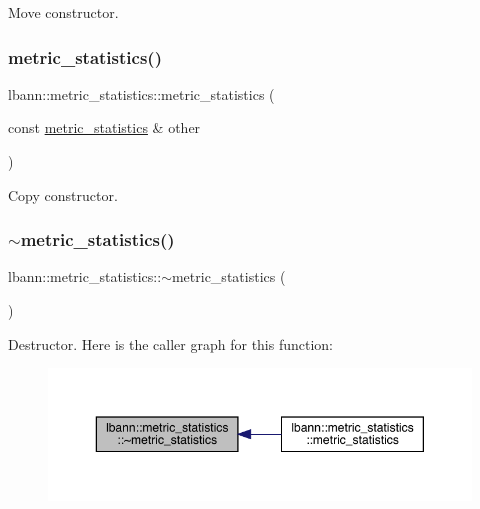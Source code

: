 Move constructor. \mbox{\label{structlbann_1_1metric__statistics_a4575aafb156f2d76a5bb29d7db1765c4}} 
\subsubsection{\texorpdfstring{metric\+\_\+statistics()}{metric\_statistics()}\hspace{0.1cm}{\footnotesize\ttfamily [3/3]}}
{\footnotesize\ttfamily lbann\+::metric\+\_\+statistics\+::metric\+\_\+statistics (\begin{DoxyParamCaption}\item[{const \hyperlink{structlbann_1_1metric__statistics}{metric\+\_\+statistics} \&}]{other }\end{DoxyParamCaption})\hspace{0.3cm}{\ttfamily [default]}}

Copy constructor. \mbox{\label{structlbann_1_1metric__statistics_aa25840fdf7ef1ea78523047cb904d2c3}} 
\subsubsection{\texorpdfstring{$\sim$metric\+\_\+statistics()}{~metric\_statistics()}}
{\footnotesize\ttfamily lbann\+::metric\+\_\+statistics\+::$\sim$metric\+\_\+statistics (\begin{DoxyParamCaption}{ }\end{DoxyParamCaption})\hspace{0.3cm}{\ttfamily [default]}}

Destructor. Here is the caller graph for this function\+:\nopagebreak
\begin{figure}[H]
\begin{center}
\leavevmode
\includegraphics[width=350pt]{structlbann_1_1metric__statistics_aa25840fdf7ef1ea78523047cb904d2c3_icgraph}
\end{center}
\end{figure}


